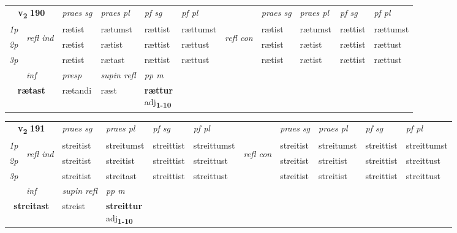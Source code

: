 \noindent
\begin{tabular}{lllllllllll} \toprule
\multicolumn{2}{c}{\textbf{v{\textsubscript{2}}} \Large{\textbf{190}}}  &  \textit{praes sg}  & \textit{praes pl}  &\textit{ pf sg} & \textit{pf pl} &  &  \textit{praes sg}  & \textit{praes pl}  & \textit{pf sg} & \textit{pf pl } \\*
	\cmidrule{3-6} \cmidrule{8-11}
 {\textit{1p}} & \multirow{3}{*}{\begin{turn}{90}\textit{refl ind}\end{turn}}  & rætist & rætumst & rættist & rættumst & \multirow{3}{*}{\begin{turn}{90}\textit{refl con}\end{turn}}  &rætist & rætumst & rættist & rættumst \\*
 {\textit{2p}} &  & rætist & rætist & rættist & rættust & &rætist & rætist & rættist & rættust \\*
 {\textit{3p}}  & & rætist & rætast & rættist & rættust & & rætist & rætist& rættist & rættust \\*
\cmidrule{3-6} \cmidrule{8-11}

   \multicolumn{2}{c}{\textit{inf}}     & \textit{presp}  & \textit{supin refl} & \textit{pp m} \\*
  \multicolumn{2}{c}{\textbf{rætast}}      & rætandi  & ræst & \specialcell{\textbf{rættur} \\ adj\textbf{\textsubscript{1-10}}} \\*
\end{tabular}

\noindent
\begin{tabular}{lllllllllll} \toprule
\multicolumn{2}{c}{\textbf{v{\textsubscript{2}}} \Large{\textbf{191}}}  &  \textit{praes sg}  & \textit{praes pl}  &\textit{ pf sg} & \textit{pf pl} &  &  \textit{praes sg}  & \textit{praes pl}  & \textit{pf sg} & \textit{pf pl } \\*
	\cmidrule{3-6} \cmidrule{8-11}
 {\textit{1p}} & \multirow{3}{*}{\begin{turn}{90}\textit{refl ind}\end{turn}}  & streitist & streitumst & streittist & streittumst & \multirow{3}{*}{\begin{turn}{90}\textit{refl con}\end{turn}}  &streitist & streitumst & streittist & streittumst \\*
 {\textit{2p}} &  & streitist & streitist & streittist & streittust & &streitist & streitist & streittist & streittust \\*
 {\textit{3p}}  & & streitist & streitast & streittist & streittust & & streitist & streitist& streittist & streittust \\*
\cmidrule{3-6} \cmidrule{8-11}

   \multicolumn{2}{c}{\textit{inf}}       & \textit{supin refl} & \textit{pp m} \\*
  \multicolumn{2}{c}{\textbf{streitast}}        & streist & \specialcell{\textbf{streittur} \\ adj\textbf{\textsubscript{1-10}}} \\*
\end{tabular}

